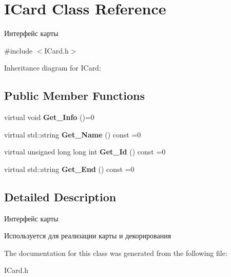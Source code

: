 \hypertarget{classICard}{}\section{I\+Card Class Reference}
\label{classICard}


Интерфейс карты  




{\ttfamily \#include $<$I\+Card.\+h$>$}



Inheritance diagram for I\+Card\+:
\subsection*{Public Member Functions}
\begin{DoxyCompactItemize}
\item 
virtual void {\bfseries Get\+\_\+\+Info} ()=0\hypertarget{classICard_a1379c3c92c368864d0f1ffcde701143d}{}\label{classICard_a1379c3c92c368864d0f1ffcde701143d}

\item 
virtual std\+::string {\bfseries Get\+\_\+\+Name} () const =0\hypertarget{classICard_a532b63bdd65e37c900244d4ddfbbbd54}{}\label{classICard_a532b63bdd65e37c900244d4ddfbbbd54}

\item 
virtual unsigned long long int {\bfseries Get\+\_\+\+Id} () const =0\hypertarget{classICard_a41eb0965b1019ad7c203b24b75992478}{}\label{classICard_a41eb0965b1019ad7c203b24b75992478}

\item 
virtual std\+::string {\bfseries Get\+\_\+\+End} () const =0\hypertarget{classICard_a3221dd789ff761a8e8278893cf8202c5}{}\label{classICard_a3221dd789ff761a8e8278893cf8202c5}

\end{DoxyCompactItemize}


\subsection{Detailed Description}
Интерфейс карты 

Используется для реализации карты и декорирования 

The documentation for this class was generated from the following file\+:\begin{DoxyCompactItemize}
\item 
I\+Card.\+h\end{DoxyCompactItemize}
